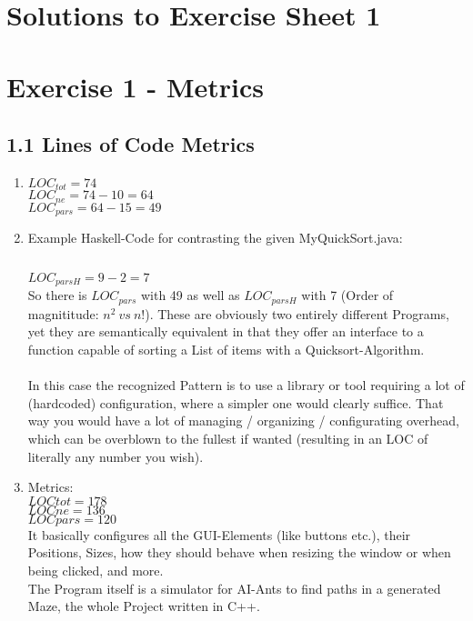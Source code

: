 \documentclass{scrartcl}
\begin{document}
\section*{Solutions to Exercise Sheet 1}

\section*{Exercise 1 - Metrics}

\subsection*{1.1 Lines of Code Metrics}

\begin{enumerate}[i]
    \item $LOC_{tot} = 74 $\\
          $ LOC_{ne} = 74 - 10 = 64 $\\
          $ LOC_{pars} = 64 - 15 = 49 $\\
    \item Example Haskell-Code for contrasting the given MyQuickSort.java: \\
        \inputminted[linenos]{Haskell}{MyQuickSort.hs}



        $LOC_{parsH} = 9 - 2 = 7$ \\
        So there is $LOC_{pars}$ with 49 as well as $LOC_{parsH}$ with 7 (Order of magnititude: $n^2\ vs\ n$!).
        These are obviously two entirely different Programs, yet they are semantically equivalent in that they
        offer an interface to a function capable of sorting a List of items with a Quicksort-Algorithm. \\ \\

        In this case the recognized Pattern is to use a library or tool requiring a lot of (hardcoded) configuration,
        where a simpler one would clearly suffice. That way you would have a lot of managing / organizing / configurating
        overhead, which can be overblown to the fullest if wanted (resulting in an LOC of literally any number you wish).

    \item Metrics: \\
        $ LOCtot = 178  $ \\
        $ LOCne = 136   $ \\
        $ LOCpars = 120 $ \\
        It basically configures all the GUI-Elements (like buttons etc.), their Positions, Sizes,
        how they should behave when resizing the window or when being clicked, and more. \\
        The Program itself is a simulator for AI-Ants to find paths in a generated Maze, the whole Project written in C++.


\end{enumerate}
\end{document}
